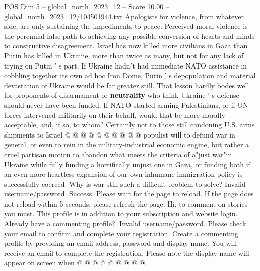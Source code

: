 \begin{textsample}{POS Dim 5 – global\_north\_2023\_12 – Score 10.00 – global\_north\_2023\_12/104501944.txt}
Apologists for violence, from whatever side, are only sustaining the impediments to peace.
Perceived moral violence is the perennial false path to achieving any possible conversion of hearts and minds to constructive disagreement.
Israel has now killed more civilians in Gaza than Putin has killed in Ukraine, more than twice as many, but not for any lack of trying on Putin ' s part.
If Ukraine hadn't had immediate NATO assistance in cobbling together its own ad hoc Iron Dome, Putin ' s depopulation and material devastation of Ukraine would be far greater still.
That lesson hardly bodes well for proponents of disarmament or \textbf{neutrality} who think Ukraine ' s defense should never have been funded.
If NATO started arming Palestinians, or if UN forces intervened militarily on their behalf, would that be more morally acceptable, and, if so, to whom?
Certainly not to those still condoning U.S. arms shipments to Israel @ @ @ @ @ @ @ @ @ @ populist will to defund war in general, or even to rein in the military-industrial economic engine, but rather a cruel partisan motion to abandon what meets the criteria of a"just war"in Ukraine while fully funding a horrifically unjust one in Gaza, or funding both if an even more heartless expansion of our own inhumane immigration policy is successfully coerced.
Why is war still such a difficult problem to solve?
Invalid username/password.
Success.
Please wait for the page to reload.
If the page does not reload within 5 seconds, please refresh the page.
Hi, to comment on stories you must.
This profile is in addition to your subscription and website login.
Already have a commenting profile?.
Invalid username/password.
Please check your email to confirm and complete your registration.
Create a commenting profile by providing an email address, password and display name.
You will receive an email to complete the registration.
Please note the display name will appear on screen when @ @ @ @ @ @ @ @ @

\end{textsample}
